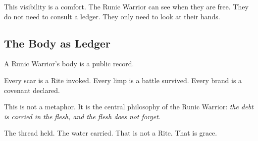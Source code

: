 This visibility is a comfort. The Runic Warrior can see when they are free. They do not need to consult a ledger. They only need to look at their hands.

\subsection{The Body as Ledger}

A Runic Warrior's body is a public record.

Every scar is a Rite invoked. Every limp is a battle survived. Every brand is a covenant declared.

This is not a metaphor. It is the central philosophy of the Runic Warrior: \textit{the debt is carried in the flesh, and the flesh does not forget.}

The thread held. The water carried. That is not a Rite. That is grace.
